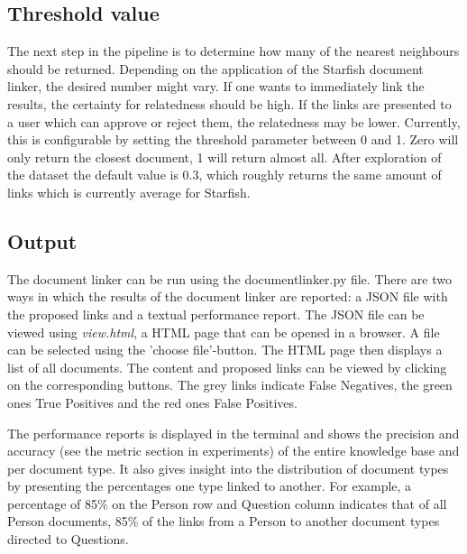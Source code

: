 \subsection{Threshold value}
The next step in the pipeline is to determine how many of the nearest neighbours should be returned. Depending on the application of the Starfish document linker, the desired number might vary. If one wants to immediately link the results, the certainty for relatedness should be high. If the links are presented to a user which can approve or reject them, the relatedness may be lower. Currently, this is configurable by setting the threshold parameter between 0 and 1. Zero will only return the closest document, 1 will return almost all. After exploration of the dataset the default value is 0.3, which roughly returns the same amount of links which is currently average for Starfish.

\subsection{Output}
The document linker can be run using the documentlinker.py file. There are two ways in which the results of the document linker are reported: a JSON file with the proposed links and a textual performance report. The JSON file can be viewed using \emph{view.html}, a HTML page that can be opened in a browser. A file can be selected using the 'choose file'-button. The HTML page then displays a list of all documents. The content and proposed links can be viewed by clicking on the corresponding buttons. The grey links indicate False Negatives, the green ones True Positives and the red ones False Positives. 

The performance reports is displayed in the terminal and shows the precision and accuracy (see the metric section in experiments) of the entire knowledge base and per document type. It also gives insight into the distribution of document types by presenting the percentages one type linked to another. For example, a percentage of 85\% on the Person row and Question column indicates that of all Person documents, 85\% of the links from a Person to another document types directed to Questions. 
